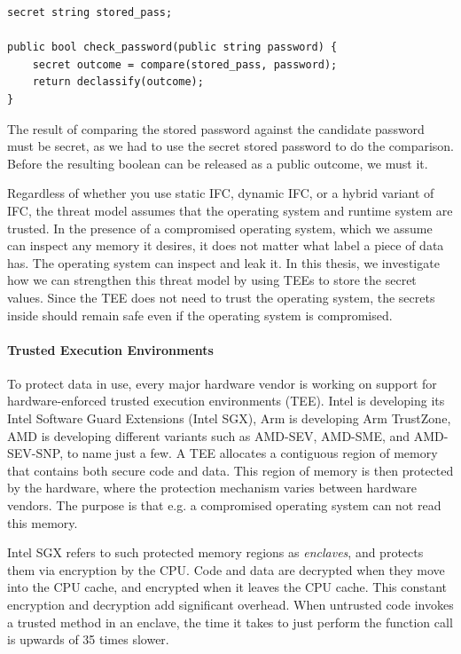\begin{verbatim}
secret string stored_pass;

public bool check_password(public string password) {
    secret outcome = compare(stored_pass, password);
    return declassify(outcome);
}
\end{verbatim}

The result of comparing the stored password against the candidate password must be secret, as we had to use the secret stored
password to do the comparison. Before the resulting boolean can be released as a public outcome, we must
 it.

Regardless of whether you use static IFC, dynamic IFC, or a hybrid variant of IFC, the threat model assumes that the
operating system and runtime system are trusted. In the presence of a compromised operating system, which we assume can
inspect any memory it desires, it does not matter what label a piece of data has. The operating system can inspect and
leak it. In this thesis, we investigate how we can strengthen this threat model by using TEEs to store the secret values.
Since the TEE does not need to trust the operating system, the secrets inside should remain safe even if the operating system
is compromised.

\paragraph{Trusted Execution Environments}

To protect data in use, every major hardware vendor is working on support for hardware-enforced trusted
execution environments (TEE). Intel is developing its Intel Software Guard Extensions (Intel SGX)\cite{intelsgx}, Arm is
developing Arm TrustZone\cite{armtz}, AMD is developing different variants such as AMD-SEV\cite{amdsev}, AMD-SME, and
AMD-SEV-SNP, to name just a few. A TEE allocates a contiguous region of memory that contains both secure code and data.
This region of memory is then protected by the hardware, where the protection mechanism varies between hardware vendors.
The purpose is that e.g. a compromised operating system can not read this memory.

Intel SGX refers to such protected memory regions as \textit{enclaves}, and protects them via encryption by the CPU. Code and
data are decrypted when they move into the CPU cache, and encrypted when it leaves the CPU cache. This constant encryption
and decryption add significant overhead. When untrusted code invokes a trusted method in an enclave, the time it takes
to just perform the function call is upwards of 35 times slower.

